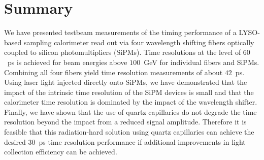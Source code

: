 \section{Summary}

We have presented testbeam measurements of the timing performance of a LYSO-based sampling calorimeter
read out via four wavelength shifting fibers optically coupled to silicon photomultipliers (SiPMs).
Time resolutions at the level of $60$~ps is achieved for beam energies above $100$~GeV for individual fibers
and SiPMs. Combining all four fibers yield time resolution measurements of about $42$~ps. Using laser
light injected directly onto SiPMs, we have demonstrated that the impact of the intrinsic time resolution
of the SiPM devices is small and that the calorimeter time resolution is dominated by the impact of the
wavelength shifter. Finally, we have shown that the use of quartz capillaries do not degrade the time resolution
beyond the impact from a reduced signal amplitude. Therefore it is feasible that this
radiation-hard solution using quartz capillaries can achieve the desired $30$~ps time resolution performance if 
additional improvements in light collection efficiency can be achieved.
